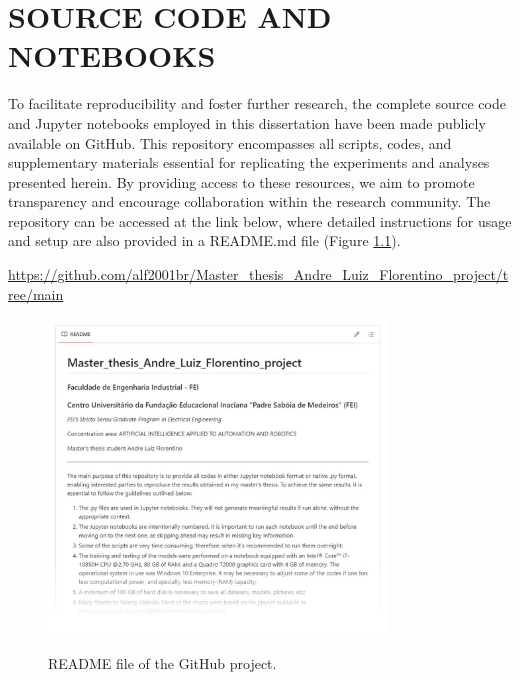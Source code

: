 \chapter{SOURCE CODE AND NOTEBOOKS 
\label{appendix:source_code}}

To facilitate reproducibility and foster further research, the complete source code and Jupyter notebooks employed in this dissertation have been made publicly available on GitHub. This repository encompasses all scripts, codes, and supplementary materials essential for replicating the experiments and analyses presented herein. By providing access to these resources, we aim to promote transparency and encourage collaboration within the research community. The repository can be accessed at the link below, where detailed instructions for usage and setup are also provided in a README.md file (Figure \ref{fig:source_code_at_github}). 

\vspace{1cm}

\href{https://github.com/alf2001br/Master_thesis_Andre_Luiz_Florentino_project/tree/main}{https://github.com/alf2001br/Master\_thesis\_Andre\_Luiz\_Florentino\_project/tree/main}

\vspace{1cm}


\begin{figure}[htbp]
    \raggedright
        \caption{README file of the GitHub project.}
        \includegraphics[width=0.80\textwidth]{resources/images/090-source_code/GitHub_project.jpg}
        \label{fig:source_code_at_github}
\end{figure}
